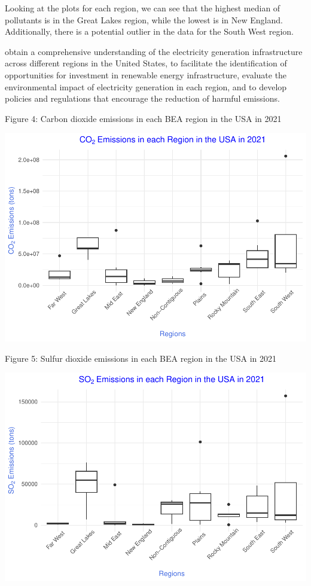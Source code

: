 \documentclass[
]{article}
\begin{document}
Looking at the plots for each region, we can see that the highest median
of pollutants is in the Great Lakes region, while the lowest is in New
England. Additionally, there is a potential outlier in the data for the
South West region.

obtain a comprehensive understanding of the electricity generation
infrastructure across different regions in the United States, to
facilitate the identification of opportunities for investment in
renewable energy infrastructure, evaluate the environmental impact of
electricity generation in each region, and to develop policies and
regulations that encourage the reduction of harmful emissions.

Figure 4: Carbon dioxide emissions in each BEA region in the USA in 2021

\begin{center}\includegraphics{EDA_Project_Mutha_Kry_Ghosh_VS_files/figure-latex/Q4plot_CO2-1} \end{center}

Figure 5: Sulfur dioxide emissions in each BEA region in the USA in 2021

\begin{center}\includegraphics{EDA_Project_Mutha_Kry_Ghosh_VS_files/figure-latex/Q4plot_SO2-1} \end{center}
\end{document}
